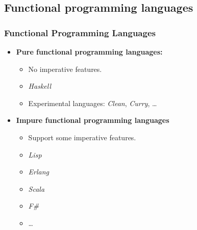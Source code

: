 \subsection{Functional programming languages}

\begin{frame}
  \frametitle{Functional Programming Languages}
  \begin{itemize}
    \item {\bf Pure functional programming languages:}
      \begin{itemize}
        \item No imperative features.
        \item \emph{Haskell}
        \item Experimental languages: \emph{Clean}, \emph{Curry}, \ldots
      \end{itemize}
    \item {\bf Impure functional programming languages}
      \begin{itemize}
        \item Support some imperative features.
        \item \emph{Lisp}
        \item \emph{Erlang}
        \item \emph{Scala}
        \item \emph{F\#}
        \item \ldots
      \end{itemize}      
  \end{itemize}
\end{frame}